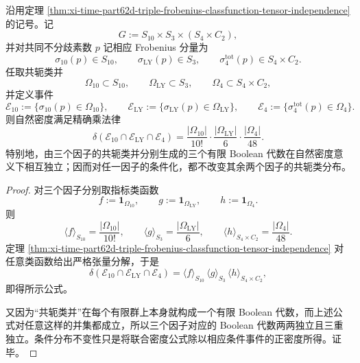 \begin{theorem}[三分歧体系上由共轭类并生成的布尔独立律]\label{thm:xi-time-part75-triple-frobenius-boolean-independence}
沿用定理 \ref{thm:xi-time-part62d-triple-frobenius-classfunction-tensor-independence} 的记号。记
\[
G:=S_{10}\times S_3\times (S_4\times C_2),
\]
并对共同不分歧素数 \(p\) 记相应 Frobenius 分量为
\[
\sigma_{10}(p)\in S_{10},
\qquad
\sigma_{\mathrm{LY}}(p)\in S_3,
\qquad
\sigma_4^{\mathrm{tot}}(p)\in S_4\times C_2.
\]
任取共轭类并
\[
\Omega_{10}\subset S_{10},
\qquad
\Omega_{\mathrm{LY}}\subset S_3,
\qquad
\Omega_4\subset S_4\times C_2,
\]
并定义事件
\[
\mathcal E_{10}:=\{\sigma_{10}(p)\in \Omega_{10}\},
\qquad
\mathcal E_{\mathrm{LY}}:=\{\sigma_{\mathrm{LY}}(p)\in \Omega_{\mathrm{LY}}\},
\qquad
\mathcal E_4:=\{\sigma_4^{\mathrm{tot}}(p)\in \Omega_4\}.
\]
则自然密度满足精确乘法律
\[
\boxed{\;
\delta(\mathcal E_{10}\cap \mathcal E_{\mathrm{LY}}\cap \mathcal E_4)
=
\frac{|\Omega_{10}|}{10!}\cdot
\frac{|\Omega_{\mathrm{LY}}|}{6}\cdot
\frac{|\Omega_4|}{48}.\;}
\]
特别地，由三个因子的共轭类并分别生成的三个有限 Boolean 代数在自然密度意义下相互独立；因而对任一因子的条件化，都不改变其余两个因子的共轭类分布。
\end{theorem}
\begin{proof}
对三个因子分别取指标类函数
\[
f:=\mathbf 1_{\Omega_{10}},
\qquad
g:=\mathbf 1_{\Omega_{\mathrm{LY}}},
\qquad
h:=\mathbf 1_{\Omega_4}.
\]
则
\[
\langle f\rangle_{S_{10}}=\frac{|\Omega_{10}|}{10!},
\qquad
\langle g\rangle_{S_3}=\frac{|\Omega_{\mathrm{LY}}|}{6},
\qquad
\langle h\rangle_{S_4\times C_2}=\frac{|\Omega_4|}{48}.
\]
定理 \ref{thm:xi-time-part62d-triple-frobenius-classfunction-tensor-independence} 对任意类函数给出严格张量分解，于是
\[
\delta(\mathcal E_{10}\cap \mathcal E_{\mathrm{LY}}\cap \mathcal E_4)
=
\langle f\rangle_{S_{10}}\,
\langle g\rangle_{S_3}\,
\langle h\rangle_{S_4\times C_2},
\]
即得所示公式。

又因为“共轭类并”在每个有限群上本身就构成一个有限 Boolean 代数，而上述公式对任意这样的并集都成立，所以三个因子对应的 Boolean 代数两两独立且三重独立。条件分布不变性只是将联合密度公式除以相应条件事件的正密度所得。证毕。
\end{proof}


